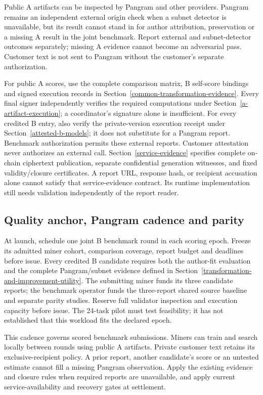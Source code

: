 Public A artifacts can be inspected by Pangram and other providers.
Pangram remains an independent external origin check when a subnet
detector is unavailable, but its result cannot stand in for author
attribution, preservation or a missing A result in the joint benchmark.
Report external and subnet-detector outcomes separately; missing A
evidence cannot become an adversarial pass. Customer text is not sent
to Pangram without the customer's separate authorization.

For public A scores, use the complete comparison matrix, B self-score
bindings and signed execution records in
Section~\ref{common-transformation-evidence}. Every final signer
independently verifies the required computations under
Section~\ref{a-artifact-execution}; a coordinator's signature alone is
insufficient. For every credited B entry, also verify the private-version
execution receipt under Section~\ref{attested-b-models}; it does not
substitute for a Pangram report. Benchmark authorization permits these
external reports. Customer attestation never authorizes an external call.
Section~\ref{service-evidence} specifies complete on-chain ciphertext
publication, separate confidential generation witnesses, and fixed
validity/closure certificates. A report URL, response hash, or recipient
accusation alone cannot satisfy that service-evidence contract. Its runtime
implementation still needs validation independently of the report reader.

\subsection{Quality anchor, Pangram cadence and parity}\label{pangram-cadence-and-parity}

At launch, schedule one joint B benchmark round in each scoring epoch.
Freeze its admitted miner cohort, comparison coverage, report budget and
deadlines before issue. Every credited B candidate requires both the
author-fit evaluation and the complete Pangram/subnet evidence defined
in Section~\ref{transformation-and-improvement-utility}. The submitting
miner funds its three candidate reports; the benchmark operator funds
the three-report shared source baseline and separate parity studies.
Reserve full validator inspection and execution capacity before issue.
The 24-task pilot must test feasibility; it has not established that
this workload fits the declared epoch.

This cadence governs scored benchmark submissions. Miners can train and
search locally between rounds using public A artifacts. Private
customer text retains its exclusive-recipient policy. A prior report,
another candidate's score or an untested estimate cannot fill a missing
Pangram observation. Apply the existing evidence and closure rules when
required reports are unavailable, and apply current service-availability
and recovery gates at settlement.

